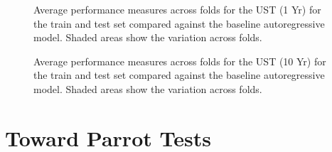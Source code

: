 \documentclass{article}
\theoremstyle{plain}
\theoremstyle{definition}
\theoremstyle{remark}
\begin{document}
\begin{figure}


\caption{\label{fig-ust-1y-b}Average performance measures across folds for the UST (1 Yr) for the train and test set compared against the baseline autoregressive model. Shaded areas show the variation across folds.}

\end{figure}%


\begin{figure}


\caption{\label{fig-ust-10-b}Average performance measures across folds for the UST (10 Yr) for the train and test set compared against the baseline autoregressive model. Shaded areas show the variation across folds.}

\end{figure}%

\section{Toward Parrot Tests}\label{appendix:parrot}
\end{document}
